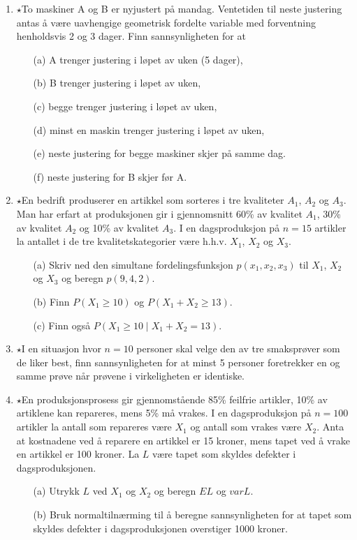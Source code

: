 \begin{enumerate}
\item $\star$To maskiner A og B er nyjustert på mandag. Ventetiden til
     neste justering antas å være uavhengige geometrisk fordelte
     variable med forventning henholdsvis 2 og 3 dager. Finn
     sannsynligheten for at
     \begin{itemize}
     \item[(a)]  A trenger justering i løpet av uken (5 dager),
     \item[(b)]  B trenger justering i løpet av uken,
     \item[(c)]  begge trenger justering i løpet av uken,
     \item[(d)]  minst en maskin trenger justering i løpet av uken,
     \item[(e)]  neste justering for begge maskiner skjer på samme dag.

     \item[(f)]  neste justering for B skjer før A.
     \end{itemize}

\item $\star$En bedrift produserer en artikkel som sorteres i tre
     kvaliteter $A_1$, $A_2$ og $A_3$. Man har erfart at
     produksjonen gir i gjennomsnitt 60\% av kvalitet $A_1$, 30\%
     av kvalitet $A_2$ og 10\% av kvalitet $A_3$. I en
     dagsproduksjon på $n=15$ artikler la antallet i de tre
     kvalitetskategorier være h.h.v. $X_1$, $X_2$ og $X_3$.
     \begin{itemize}
     \item[(a)]  Skriv ned den simultane fordelingsfunksjon $p(x_1, x_2, x_3)$
        til $X_1$, $X_2$ og $X_3$ og beregn $p(9,4,2)$.
     \item[(b)]  Finn $P(X_1\geq 10)$ og $P(X_1+X_2\geq 13)$.
     \item[(c)]  Finn også $P(X_1\geq 10\mid X_1+X_2=13)$.
     \end{itemize}

\item $\star$I en situasjon hvor $n=10$ personer skal velge den av tre
     smaksprøver som de liker best, finn sannsynligheten for at
     minst 5 personer foretrekker en og samme prøve når prøvene i
     virkeligheten er identiske.


\item $\star$En produksjonsprosess gir gjennomstående 85\% feilfrie
     artikler, 10\% av artiklene kan repareres, mens 5\% må vrakes.
     I en dagsproduksjon på $n=100$ artikler la antall som
     repareres være $X_1$ og antall som vrakes være $X_2$. Anta
     at kostnadene ved å reparere en artikkel er 15 kroner, mens
     tapet ved å vrake en artikkel er 100 kroner. La $L$ være
     tapet som skyldes defekter i dagsproduksjonen.
     \begin{itemize}
     \item[(a)] Utrykk $L$ ved $X_1$ og $X_2$ og beregn $EL$ og $varL$.
     \item[(b)] Bruk normaltilnærming til å beregne sannsynligheten for
          at tapet som skyldes defekter i dagsproduksjonen
          overstiger 1000 kroner.
     \end{itemize}
                 

\end{enumerate}
